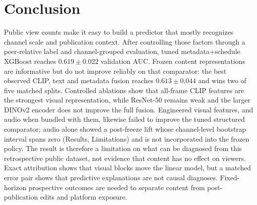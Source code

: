 \documentclass[letterpaper]{article}
\begin{document}
\section{Conclusion}

Public view counts make it easy to build a predictor that mostly recognizes
channel scale and publication context. After controlling those factors through
a peer-relative label and channel-grouped evaluation, tuned metadata+schedule
XGBoost reaches $0.619\pm0.022$ validation AUC. Frozen content representations
are informative but do not improve reliably on that comparator: the best
observed CLIP, text and metadata fusion reaches $0.613\pm0.044$ and wins two of
five matched splits. Controlled ablations show that all-frame CLIP features are
the strongest visual representation, while ResNet-50 remains weak and the larger
DINOv2 encoder does not improve the full fusion. Engineered visual features, and
audio when bundled with them, likewise failed to improve the tuned structured
comparator; audio alone showed a post-freeze lift whose channel-level bootstrap
interval spans zero (Results, Limitations) and is not incorporated into the
frozen policy.
The result is therefore a limitation on what can be
diagnosed from this retrospective public dataset, not evidence that content has
no effect on viewers. Exact attribution shows that visual blocks move the
linear model, but a matched error pair shows that predictive explanations are
not causal diagnoses.
Fixed-horizon prospective outcomes are needed to separate content from
post-publication edits and platform exposure.


\footnotesize

\end{document}
